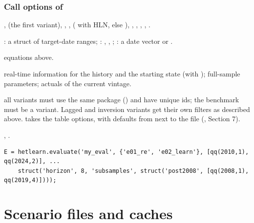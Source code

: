 \documentclass[11pt,a4paper]{article}
\DeclareRobustCommand{\codem}[1]{\texttt{\detokenize{#1}}}
\newenvironment{optspec}%
  {\begin{description}[style=sameline,leftmargin=2.7cm,labelwidth=2.5cm,font=\normalfont\itshape]}%
  {\end{description}}
\begin{document}
\subsubsection{Call options of \texorpdfstring{\codem{hetlearn.evaluate}}{hetlearn.evaluate}}\label{opt:evaluate}
\begin{optspec}
  \item[Default] ,  (the first variant), ,
        ,  ( with HLN, else
        ), , ,
        , , .
  \item[Values] : a struct of  target-date ranges;
        : , , ; : a date
        vector or .
  \item[Math] equations above.
  \item[Assumptions] real-time information for the history and the starting state (with
        ); full-sample parameters; actuals of the current vintage.
  \item[Interactions] all variants must use the same package () and
        have unique ids; the benchmark must be a variant. Lagged and inversion variants get their
        own filters as described above.  takes the table options, with
        defaults from  next to the file (,
        Section 7).
  \item[Code] , .
  \item[Example]
\begin{lstlisting}
E = hetlearn.evaluate('my_eval', {'e01_re', 'e02_learn'}, [qq(2010,1), qq(2024,2)], ...
    struct('horizon', 8, 'subsamples', struct('post2008', [qq(2008,1), qq(2019,4)])));
\end{lstlisting}
\end{optspec}

\section{Scenario files and caches}\label{sec:options}
\end{document}
